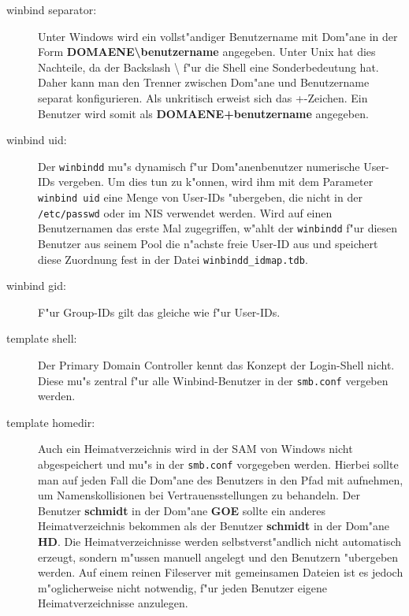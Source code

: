 \documentclass{scrartcl}\usepackage{pslatex}\typearea{12}
\newcommand{\prog}{\texttt}
\newcommand{\param}{\texttt}
\newcommand{\dateistyle}{\texttt}
\newcommand{\username}{\textbf}
\begin{document}
\begin{description} 
  
\item[winbind separator:] Unter Windows wird ein vollst"andiger
  Benutzername mit Dom"ane in der Form
  \username{DOMAENE\textbackslash{}benutzername} angegeben. Unter Unix
  hat dies Nachteile, da der Backslash \textbackslash{} f"ur die Shell
  eine Sonderbedeutung hat. Daher kann man den Trenner zwischen
  Dom"ane und Benutzername separat konfigurieren. Als unkritisch
  erweist sich das +-Zeichen. Ein Benutzer wird somit als
  \username{DOMAENE+benutzername} angegeben.
  
\item[winbind uid:] Der \prog{winbindd} mu"s dynamisch f"ur
  Dom"anenbenutzer numerische User-IDs vergeben. Um dies tun zu
  k"onnen, wird ihm mit dem Parameter \param{winbind uid} eine Menge
  von User-IDs "ubergeben, die nicht in der \dateistyle{/etc/passwd}
  oder im NIS verwendet werden. Wird auf einen Benutzernamen das erste
  Mal zugegriffen, w"ahlt der \prog{winbindd} f"ur diesen Benutzer aus
  seinem Pool die n"achste freie User-ID aus und speichert diese
  Zuordnung fest in der Datei \dateistyle{winbindd\_idmap.tdb}.
  
\item[winbind gid:] F"ur Group-IDs gilt das gleiche wie f"ur User-IDs.
  
\item[template shell:] Der Primary Domain Controller kennt das Konzept
  der Login-Shell nicht. Diese mu"s zentral f"ur alle Winbind-Benutzer
  in der \dateistyle{smb.conf} vergeben werden.
  
\item[template homedir:] Auch ein Heimatverzeichnis wird in der SAM
  von Windows nicht abgespeichert und mu"s in der
  \dateistyle{smb.conf} vorgegeben werden. Hierbei sollte man auf
  jeden Fall die Dom"ane des Benutzers in den Pfad mit aufnehmen, um
  Namenskollisionen bei Vertrauensstellungen zu behandeln. Der
  Benutzer \username{schmidt} in der Dom"ane \username{GOE} sollte ein
  anderes Heimatverzeichnis bekommen als der Benutzer
  \username{schmidt} in der Dom"ane \username{HD}. Die
  Heimatverzeichnisse werden selbstverst"andlich nicht automatisch
  erzeugt, sondern m"ussen manuell angelegt und den Benutzern
  "ubergeben werden. Auf einem reinen Fileserver mit gemeinsamen
  Dateien ist es jedoch m"oglicherweise nicht notwendig, f"ur jeden
  Benutzer eigene Heimatverzeichnisse anzulegen.
\end{description}
\end{document}
